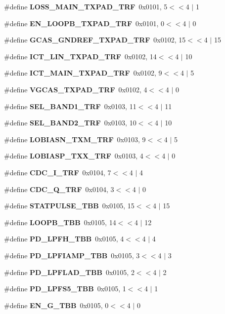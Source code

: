 \begin{DoxyCompactItemize}
\item 
\#define {\bf L\+O\+S\+S\+\_\+\+M\+A\+I\+N\+\_\+\+T\+X\+P\+A\+D\+\_\+\+T\+RF}~0x0101, 5$<$$<$4 $\vert$  1
\item 
\#define {\bf E\+N\+\_\+\+L\+O\+O\+P\+B\+\_\+\+T\+X\+P\+A\+D\+\_\+\+T\+RF}~0x0101, 0$<$$<$4 $\vert$  0
\item 
\#define {\bf G\+C\+A\+S\+\_\+\+G\+N\+D\+R\+E\+F\+\_\+\+T\+X\+P\+A\+D\+\_\+\+T\+RF}~0x0102, 15$<$$<$4 $\vert$  15
\item 
\#define {\bf I\+C\+T\+\_\+\+L\+I\+N\+\_\+\+T\+X\+P\+A\+D\+\_\+\+T\+RF}~0x0102, 14$<$$<$4 $\vert$  10
\item 
\#define {\bf I\+C\+T\+\_\+\+M\+A\+I\+N\+\_\+\+T\+X\+P\+A\+D\+\_\+\+T\+RF}~0x0102, 9$<$$<$4 $\vert$  5
\item 
\#define {\bf V\+G\+C\+A\+S\+\_\+\+T\+X\+P\+A\+D\+\_\+\+T\+RF}~0x0102, 4$<$$<$4 $\vert$  0
\item 
\#define {\bf S\+E\+L\+\_\+\+B\+A\+N\+D1\+\_\+\+T\+RF}~0x0103, 11$<$$<$4 $\vert$  11
\item 
\#define {\bf S\+E\+L\+\_\+\+B\+A\+N\+D2\+\_\+\+T\+RF}~0x0103, 10$<$$<$4 $\vert$  10
\item 
\#define {\bf L\+O\+B\+I\+A\+S\+N\+\_\+\+T\+X\+M\+\_\+\+T\+RF}~0x0103, 9$<$$<$4 $\vert$  5
\item 
\#define {\bf L\+O\+B\+I\+A\+S\+P\+\_\+\+T\+X\+X\+\_\+\+T\+RF}~0x0103, 4$<$$<$4 $\vert$  0
\item 
\#define {\bf C\+D\+C\+\_\+\+I\+\_\+\+T\+RF}~0x0104, 7$<$$<$4 $\vert$  4
\item 
\#define {\bf C\+D\+C\+\_\+\+Q\+\_\+\+T\+RF}~0x0104, 3$<$$<$4 $\vert$  0
\item 
\#define {\bf S\+T\+A\+T\+P\+U\+L\+S\+E\+\_\+\+T\+BB}~0x0105, 15$<$$<$4 $\vert$  15
\item 
\#define {\bf L\+O\+O\+P\+B\+\_\+\+T\+BB}~0x0105, 14$<$$<$4 $\vert$  12
\item 
\#define {\bf P\+D\+\_\+\+L\+P\+F\+H\+\_\+\+T\+BB}~0x0105, 4$<$$<$4 $\vert$  4
\item 
\#define {\bf P\+D\+\_\+\+L\+P\+F\+I\+A\+M\+P\+\_\+\+T\+BB}~0x0105, 3$<$$<$4 $\vert$  3
\item 
\#define {\bf P\+D\+\_\+\+L\+P\+F\+L\+A\+D\+\_\+\+T\+BB}~0x0105, 2$<$$<$4 $\vert$  2
\item 
\#define {\bf P\+D\+\_\+\+L\+P\+F\+S5\+\_\+\+T\+BB}~0x0105, 1$<$$<$4 $\vert$  1
\item 
\#define {\bf E\+N\+\_\+\+G\+\_\+\+T\+BB}~0x0105, 0$<$$<$4 $\vert$  0
\item 
$$
\end{DoxyCompactItemize}
